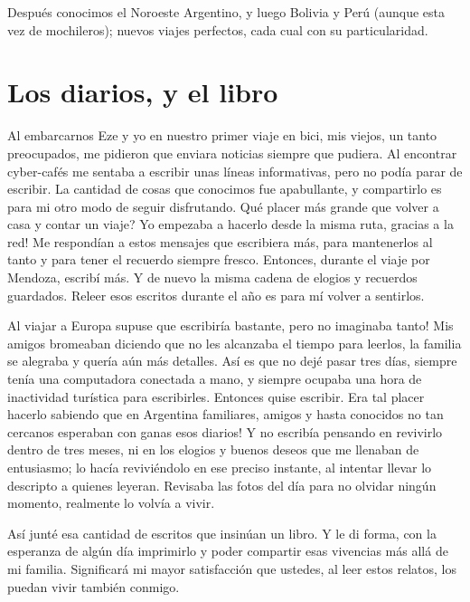 \documentclass[11pt]{book}
\begin{document}
Despu\'es conocimos el Noroeste Argentino, y luego Bolivia y Per\'u (aunque esta vez de mochileros); nuevos viajes perfectos, cada cual con su particularidad.

\section{Los diarios, y el libro}

Al embarcarnos Eze y yo en nuestro primer viaje en bici, mis viejos, un tanto
preocupados, me pidieron que enviara noticias siempre que pudiera. Al
encontrar cyber-caf\'es me sentaba a escribir unas l\'ineas informativas, pero
no pod\'ia parar de escribir. La cantidad de cosas que conocimos fue
apabullante, y compartirlo es para mi otro modo de seguir disfrutando.
\textquestiondown Qu\'e placer m\'as grande que volver a casa y contar un
viaje? \textexclamdown Yo empezaba a hacerlo desde la misma ruta, gracias a la
red! Me respond\'ian a estos mensajes que escribiera m\'as, para mantenerlos
al tanto y para tener el recuerdo siempre fresco. Entonces, durante el viaje
por Mendoza, escrib\'i m\'as. Y de nuevo la misma cadena de elogios y
recuerdos guardados. Releer esos escritos durante el a\~no es para m\'i volver
a sentirlos.

Al viajar a Europa supuse que escribir\'ia bastante, \textexclamdown pero no
imaginaba tanto! Mis amigos bromeaban diciendo que no les alcanzaba el tiempo
para leerlos, la familia se alegraba y quer\'ia a\'un m\'as detalles. As\'i es
que no dej\'e pasar tres d\'ias, siempre ten\'ia una computadora conectada a
mano, y siempre ocupaba una hora de inactividad tur\'istica para escribirles.
Entonces quise escribir. \textexclamdown Era tal placer hacerlo sabiendo que
en Argentina familiares, amigos y hasta conocidos no tan cercanos esperaban
con ganas esos diarios! Y no escrib\'ia pensando en revivirlo dentro de tres
meses, ni en los elogios y buenos deseos que me llenaban de entusiasmo; lo
hac\'ia revivi\'endolo en ese preciso instante, al intentar llevar lo
descripto a quienes leyeran. Revisaba las fotos del d\'ia para no olvidar
ning\'un momento, realmente lo volv\'ia a vivir.

As\'i junt\'e esa cantidad de escritos que insin\'uan un libro. Y le di forma,
con la esperanza de alg\'un d\'ia imprimirlo y poder compartir esas vivencias
m\'as all\'a de mi familia. Significar\'a mi mayor satisfacci\'on que ustedes,
al leer estos relatos, los puedan vivir tambi\'en conmigo.\\
\end{document}

